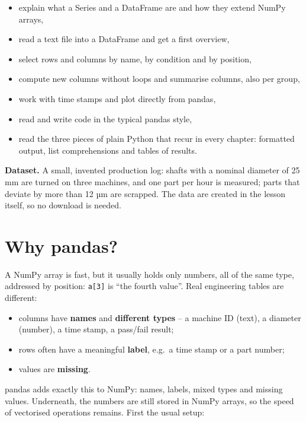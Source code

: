 \documentclass[
  letterpaper,
  DIV=11,
  numbers=noendperiod]{scrreprt}
\providecommand{\tightlist}{%
  \setlength{\itemsep}{0pt}\setlength{\parskip}{0pt}}\usepackage{longtable,booktabs,array}
\begin{document}
\begin{itemize}
\tightlist
\item
  explain what a Series and a DataFrame are and how they extend NumPy
  arrays,
\item
  read a text file into a DataFrame and get a first overview,
\item
  select rows and columns by name, by condition and by position,
\item
  compute new columns without loops and summarise columns, also per
  group,
\item
  work with time stamps and plot directly from pandas,
\item
  read and write code in the typical pandas style,
\item
  read the three pieces of plain Python that recur in every chapter:
  formatted output, list comprehensions and tables of results.
\end{itemize}

\textbf{Dataset.} A small, invented production log: shafts with a
nominal diameter of 25 mm are turned on three machines, and one part per
hour is measured; parts that deviate by more than 12 µm are scrapped.
The data are created in the lesson itself, so no download is needed.

\section*{Why pandas?}\label{why-pandas}


A NumPy array is fast, but it usually holds only numbers, all of the
same type, addressed by position: \texttt{a{[}3{]}} is ``the fourth
value''. Real engineering tables are different:

\begin{itemize}
\tightlist
\item
  columns have \textbf{names} and \textbf{different types} -- a machine
  ID (text), a diameter (number), a time stamp, a pass/fail result;
\item
  rows often have a meaningful \textbf{label}, e.g.~a time stamp or a
  part number;
\item
  values are \textbf{missing}.
\end{itemize}

pandas adds exactly this to NumPy: names, labels, mixed types and
missing values. Underneath, the numbers are still stored in NumPy
arrays, so the speed of vectorised operations remains. First the usual
setup:
\end{document}

